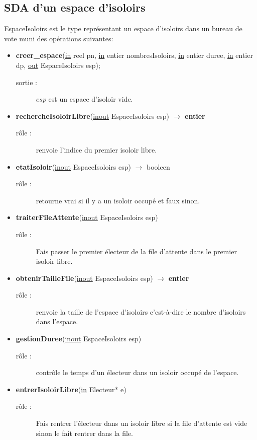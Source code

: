 \documentclass[12pt]{article} %
\begin{document}
\subsection*{SDA d'un espace d'isoloirs}
EspaceIsoloirs est le type représentant un espace d'isoloirs dans un bureau de vote muni des opérations suivantes:
\begin{itemize}
	\item \textbf{creer\_espace}(\underline{in} reel pn, \underline{in} entier nombresIsoloirs, \underline{in} entier duree, \underline{in} entier dp, \underline{out} EspaceIsoloirs esp);
	\begin{description}
		\item[sortie :] $esp$ est un espace d'isoloir vide.
	\end{description}
	\item \textbf{rechercheIsoloirLibre}(\underline{inout} EspaceIsoloirs esp) $\rightarrow$ \textbf{entier}
	\begin{description}
		\item[rôle :] renvoie l'indice du premier isoloir libre.
	\end{description}
	\item \textbf{etatIsoloir}(\underline{inout} EspaceIsoloirs esp) $\rightarrow$ booleen
	\begin{description}
		\item[rôle :] retourne vrai si il y a un isoloir occupé et faux sinon.
	\end{description}
	\item \textbf{traiterFileAttente}(\underline{inout} EspaceIsoloirs esp)
	\begin{description}
		\item[rôle :] Fais passer le premier électeur de la file d'attente dans le premier isoloir libre.
	\end{description}
	\item \textbf{obtenirTailleFile}(\underline{inout} EspaceIsoloirs esp) $\rightarrow$ \textbf{entier}
		\begin{description}
		\item[rôle :] renvoie la taille de l'espace d'isoloirs c'est-à-dire le nombre d'isoloirs dans l'espace.
	\end{description}
	\item \textbf{gestionDuree}(\underline{inout} EspaceIsoloirs esp)
		\begin{description}
		\item[rôle :] contrôle le temps d'un électeur dans un isoloir occupé de l'espace.
	\end{description}
	\item \textbf{entrerIsoloirLibre}(\underline{in} Electeur* e)
	\begin{description}
		\item[rôle :] Fais rentrer l'électeur dans un isoloir libre si la file d'attente est vide sinon le fait rentrer dans la file.
	\end{description}
\end{itemize}
\newpage
\end{document}
